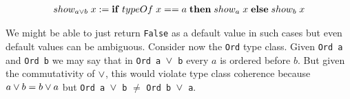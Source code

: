 \begin{gather}
  \nonumber show_{a\vee b} \; x := {\bf if} \; typeOf \; x == a \; {\bf then} \; show_a \; x \; {\bf else} \; show_b \; x
\end{gather}

We might be able to just return \texttt{False} as a default value in such cases but even default values can be ambiguous.
Consider now the \texttt{Ord} type class. Given \texttt{Ord a} and \texttt{Ord b} we may say that in \texttt{Ord a $\vee$ b} every $a$ is ordered before $b$.
But given the commutativity of $\vee$, this would violate type class coherence because $a \vee b = b \vee a$ but \texttt{Ord a $\vee$ b} $\neq$ \texttt{Ord b $\vee$ a}.

